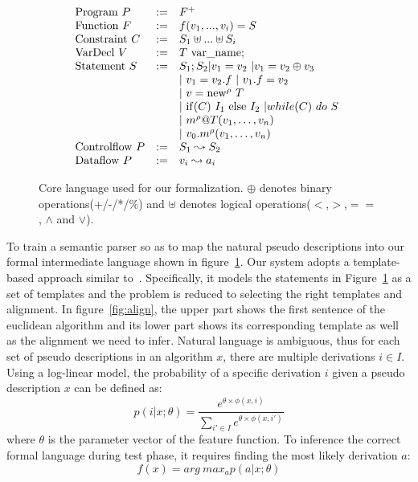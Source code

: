 \documentclass[11pt]{article}
\begin{document}
 \begin{figure}[t]
 \small
\[
\begin{array}{lll}
{\rm Program} \ P & := & F^+ \\
{\rm Function} \ F & := &  f(v_1,...,v_i) = S \\
{\rm Constraint} \ C & := & S_1 \uplus ... \uplus S_i \\
{\rm VarDecl} \ V & := & T \  {\rm var\_name}; \\
{\rm Statement} \ S & := & S_1;S_2 | v_1 = v_2 \ | v_1 = v_2 \oplus v_3 \ \\
& & | \ v_1 = v_2.f \ | \ v_1.f = v_2 \\
& & | \ v = {\rm new}^\rho \ T  \ \\
& & |  \ {\rm if}(C) \ I_1 \ {\rm else} \ I_2 \ | while(C) \ do \ S \ \\
& & | \ m^\rho@T(v_1, \ldots, v_n) \ \\
& & | \ v_0.m^\rho(v_1, \ldots, v_n) \\
{\rm Control flow} \ P & := & S_1 \leadsto S_2 \\
{\rm Data flow} \ P & := & v_i \leadsto a_i \\

\end{array}
\]
\vspace{-0.2in}
\caption{Core language used for our formalization. $\oplus$ denotes 
binary operations(+/-/*/\%) and $\uplus$ denotes logical 
operations($<$,$>$,$==$, $\land$ and $\lor$). }\label{fig:language}
\vspace{-0.1in}
\end{figure}
To train a semantic parser so as to map the natural pseudo descriptions into our 
formal intermediate language shown in figure~\ref{fig:language}. 
Our system adopts a template-based approach similar to~\cite{word}. Specifically,  
it models the statements in Figure~\ref{fig:language} as a set of templates
and the problem is reduced to selecting the right templates and alignment. In figure~\ref{fig:align},
 the upper part shows the first sentence of the euclidean algorithm and its lower part
 shows its corresponding template as well as the alignment we need to infer.
Natural language is ambiguous, thus for each set of pseudo descriptions
in an algorithm $x$, there are multiple derivations $i\in I$. Using a 
log-linear model, the probability of a specific derivation $i$ given 
a pseudo description $x$ can be defined as:
\[
  p(i|x;\theta) = \frac{e^{\theta \times \phi(x,i)}}{\sum_{i'\in I}{e^{\theta \times \phi(x,i')}}}
\]
where $\theta$ is the parameter vector of the feature function.  To inference
the correct formal language during test phase, it requires finding the 
most likely derivation $a$: 
\[
f(x) = arg \ max_{a} p(a|x;\theta)
\]
\end{document}
